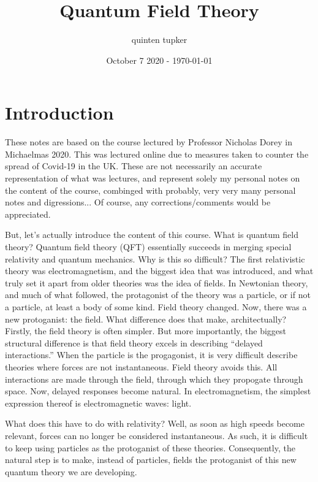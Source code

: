 \documentclass{report}
\title{Quantum Field Theory}
\author{quinten tupker}
\date{October 7 2020 - \today}
\theoremstyle{definition}
\begin{document}
\maketitle

\section*{Introduction}

These notes are based on the course lectured by Professor Nicholas Dorey in Michaelmas 2020.
This was lectured online due to measures taken to counter the spread of Covid-19
in the UK. These are not necessarily an accurate representation of what was
lectures, and represent solely my personal notes on the content of the course,
combinged with probably, very very many personal notes and digressions... Of
course, any corrections/comments would be appreciated.

But, let's actually introduce the content of this course. What is quantum field
theory? Quantum field theory (QFT) essentially succeeds in merging special
relativity
and quantum mechanics. Why is this so difficult? The first relativistic theory
was electromagnetism, and the biggest idea that was introduced, and what truly
set it apart from older theories was the idea of fields. In Newtonian theory, and much of what
followed, the protagonist of the theory was a particle, or if not a particle, at
least a body of some kind. Field theory changed. Now, there was a new
protoganist: the field. What difference does that make, architectually? Firstly,
the field theory is often simpler. But more importantly, the biggest structural
difference is that field theory excels in describing ``delayed interactions.''
When the particle is the progagonist, it is very difficult describe theories
where forces are not instantaneous. Field theory avoids this. All interactions
are made through the field, through which they propogate through space. Now,
delayed responses become natural. In electromagnetism, the simplest expression
thereof is electromagnetic waves: light. 

What does this have to do with relativity? Well, as soon as high speeds become
relevant, forces can no longer be considered instantaneous. As such, it is
difficult to keep using particles as the protoganist of these theories.
Consequently, the natural step is to make, instead of particles, fields the
protoganist of this new quantum theory we are developing.
\end{document}
